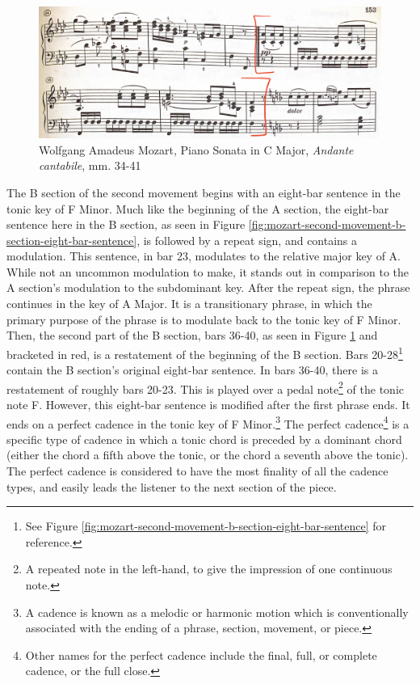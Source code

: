 \begin{figure}[h]
	\centering
	\includegraphics[width=\textwidth]{figures/mozart-second-movement-second-half-b-section.jpg}
	\caption{Wolfgang Amadeus Mozart, Piano Sonata in C Major, \textit{Andante cantabile}, mm. 34-41}
	\label{fig:mozart-second-movement-second-half-b-section}
\end{figure}

The B section of the second movement begins with an eight-bar sentence in the tonic key of F Minor. Much like the beginning of the A section, the eight-bar sentence here in the B section, as seen in Figure \ref{fig:mozart-second-movement-b-section-eight-bar-sentence}\autocite{Henle_1977}, is followed by a repeat sign, and contains a modulation. This sentence, in bar 23, modulates to the relative major key of A\musFlat{}. While not an uncommon modulation to make, it stands out in comparison to the A section's modulation to the subdominant key. After the repeat sign, the phrase continues in the key of A\musFlat{} Major. It is a transitionary phrase, in which the primary purpose of the phrase is to modulate back to the tonic key of F Minor. Then, the second part of the B section, bars 36-40, as seen in Figure \ref{fig:mozart-second-movement-second-half-b-section}\autocite{Henle_1977} and bracketed in red, is a restatement of the beginning of the B section. Bars 20-28\footnote{See Figure \ref{fig:mozart-second-movement-b-section-eight-bar-sentence} for reference.} contain the B section's original eight-bar sentence. In bars 36-40, there is a restatement of roughly bars 20-23. This is played over a pedal note\footnote{A repeated note in the left-hand, to give the impression of one continuous note.} of the tonic note F. However, this eight-bar sentence is modified after the first phrase ends. It ends on a perfect cadence\autocite{Nagley_Whittall_2011} in the tonic key of F Minor.\footnote{A cadence is known as a melodic or harmonic motion which is conventionally associated with the ending of a phrase, section, movement, or piece.} The perfect cadence\footnote{Other names for the perfect cadence include the final, full, or complete cadence, or the full close.} is a specific type of cadence in which a tonic chord is preceded by a dominant chord (either the chord a fifth above the tonic, or the chord a seventh above the tonic). The perfect cadence is considered to have the most finality of all the cadence types, and easily leads the listener to the next section of the piece.

